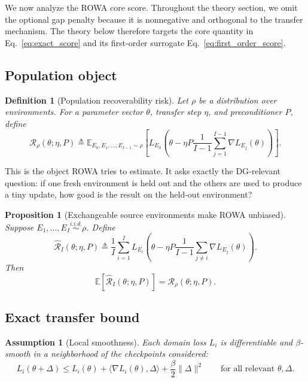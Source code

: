 \documentclass{article}
\newtheorem{proposition}{Proposition}
\newtheorem{definition}{Definition}
\newtheorem{assumption}{Assumption}
\newcommand{\EE}{\mathbb{E}}
\newcommand{\iid}{i.i.d.}
\newcommand{\rowa}{\textup{\textsc{ROWA}}}
\begin{document}
We now analyze the \rowa{} core score. Throughout the theory section, we omit the optional gap penalty because it is nonnegative and orthogonal to the transfer mechanism. The theory below therefore targets the core quantity in Eq.~\eqref{eq:exact_score} and its first-order surrogate Eq.~\eqref{eq:first_order_score}.

\subsection{Population object}

\begin{definition}[Population recoverability risk]
Let $\rho$ be a distribution over environments. For a parameter vector $\theta$, transfer step $\eta$, and preconditioner $P$, define
\begin{equation}
    \mathcal{R}_{\rho}(\theta;\eta,P) \triangleq
    \EE_{E_0,E_1,\dots,E_{I-1}\sim \rho}
    \left[
    L_{E_0}\left(
    \theta - \eta P \frac{1}{I-1}\sum_{j=1}^{I-1}\nabla L_{E_j}(\theta)
    \right)
    \right].
\end{equation}
\end{definition}

This is the object \rowa{} tries to estimate. It asks exactly the DG-relevant question: if one fresh environment is held out and the others are used to produce a tiny update, how good is the result on the held-out environment?

\begin{proposition}[Exchangeable source environments make \rowa{} unbiased]
\label{prop:unbiased}
Suppose $E_1,\dots,E_I \stackrel{\iid}{\sim} \rho$. Define
\begin{equation}
    \widehat{\mathcal{R}}_I(\theta;\eta,P) \triangleq
    \frac{1}{I}\sum_{i=1}^{I}
    L_{E_i}\left(
    \theta - \eta P \frac{1}{I-1}\sum_{j\neq i}\nabla L_{E_j}(\theta)
    \right).
\end{equation}
Then
\begin{equation}
    \EE[\widehat{\mathcal{R}}_I(\theta;\eta,P)] = \mathcal{R}_{\rho}(\theta;\eta,P).
\end{equation}
\end{proposition}

\subsection{Exact transfer bound}

\begin{assumption}[Local smoothness]
\label{ass:smooth}
Each domain loss $L_i$ is differentiable and $\beta$-smooth in a neighborhood of the checkpoints considered:
\begin{equation}
    L_i(\theta+\Delta)
    \le
    L_i(\theta) + \langle \nabla L_i(\theta), \Delta\rangle + \frac{\beta}{2}\|\Delta\|^2
    \qquad
    \text{for all relevant } \theta,\Delta.
\end{equation}
\end{assumption}
\end{document}
